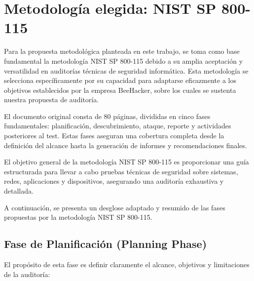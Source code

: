 \documentclass[a4paper, 10pt]{article}
\begin{document}
\clearpage







\section{Metodología elegida: NIST SP 800-115}


Para la propuesta metodológica planteada en este trabajo, se toma como base fundamental la metodología NIST SP 800-115 debido a su amplia aceptación y versatilidad en auditorías técnicas de seguridad informática. Esta metodología se selecciona específicamente por su capacidad para adaptarse eficazmente a los objetivos establecidos por la empresa BeeHacker, sobre los cuales se sustenta nuestra propuesta de auditoría. 
\par\vspace{0.5cm}


El documento original consta de 80 páginas, divididas en cinco fases fundamentales: planificación, descubrimiento, ataque, reporte y actividades posteriores al test. Estas fases aseguran una cobertura completa desde la definición del alcance hasta la generación de informes y recomendaciones finales.
\par\vspace{0.5cm}

El objetivo general de la metodología NIST SP 800-115 es proporcionar una guía estructurada para llevar a cabo pruebas técnicas de seguridad sobre sistemas, redes, aplicaciones y dispositivos, asegurando una auditoría exhaustiva y detallada. \cite{nist800115}
\par\vspace{0.5cm}

A continuación, se presenta un desglose adaptado y resumido de las fases propuestas por la metodología NIST SP 800-115.


\subsection{Fase de Planificación (Planning Phase)}

El propósito de esta fase es definir claramente el alcance, objetivos y limitaciones de la auditoría:
\end{document}
